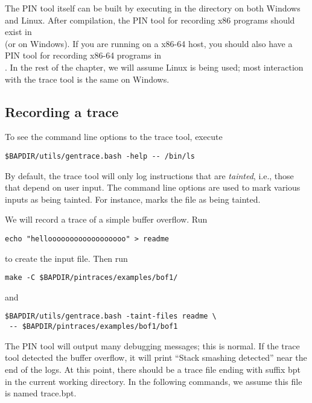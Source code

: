 The PIN tool itself can be built by executing  in the
 directory on both Windows and Linux.
After compilation, the PIN tool for recording x86 programs should exist in \\
 (or
 on Windows).  If you are running on a x86-64
host, you should also have a PIN tool for recording x86-64 programs in\\
.  In the rest of
the chapter, we will assume Linux is being used; most interaction with
the trace tool is the same on Windows.

\subsection{Recording a trace}

To see the command line options to the trace tool, execute 

\begin{verbatim}
$BAPDIR/utils/gentrace.bash -help -- /bin/ls
\end{verbatim}

By default, the trace tool will only log instructions that are
\emph{tainted}, i.e., those that depend on user input.  The
 command line options are used to mark various
inputs as being tainted.  For instance, 
marks the file  as being tainted.

We will record a trace of a simple buffer overflow.  Run 

\begin{verbatim}
echo "helloooooooooooooooooo" > readme
\end{verbatim}

 to create the input file.  Then run 

\begin{verbatim}
make -C $BAPDIR/pintraces/examples/bof1/
\end{verbatim}

and

\begin{verbatim}
$BAPDIR/utils/gentrace.bash -taint-files readme \
 -- $BAPDIR/pintraces/examples/bof1/bof1
\end{verbatim}

The PIN tool will output
many debugging messages; this is normal.  If the trace tool detected
the buffer overflow, it will print ``Stack smashing detected'' near
the end of the logs.  At this point, there should be a trace file
ending with suffix bpt in the current working directory.  In the
following commands, we assume this file is named trace.bpt.


